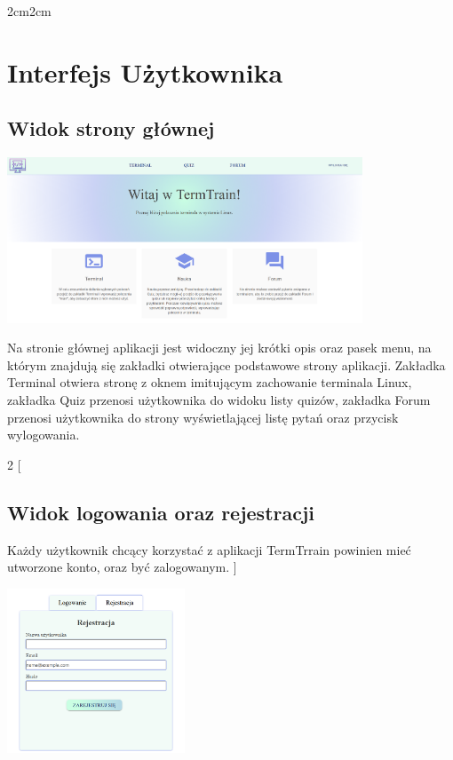 \documentclass[10pt,a4paper]{report}
\begin{document}
\begin{adjustwidth}{2cm}{2cm}
\section{Interfejs Użytkownika}
\subsection{Widok strony głównej}
\begin{minipage}{\linewidth}
\begin{center}
  \includegraphics[width=400px]{project/main_page.png}
\end{center}
\end{minipage}
\begin{minipage}{1\linewidth}
\vspace{0.3cm}
Na stronie głównej aplikacji jest widoczny jej krótki opis oraz
pasek menu, na którym znajdują się zakładki otwierające podstawowe strony aplikacji.
Zakładka Terminal otwiera stronę z oknem  imitującym zachowanie terminala Linux, zakładka Quiz przenosi
użytkownika do widoku listy quizów, zakładka Forum przenosi użytkownika do strony
wyświetlającej listę pytań oraz przycisk wylogowania.
\end{minipage}
\begin{multicols}{2}
[
\subsection{Widok logowania oraz rejestracji}
Każdy użytkownik chcący korzystać z aplikacji TermTrrain powinien mieć utworzone konto, oraz być zalogowanym.
]
\begin{minipage}{\linewidth}
  \includegraphics[width=200px]{project/rejestracja.png}
\end{minipage}


\end{multicols}
\end{adjustwidth}
\end{document}

